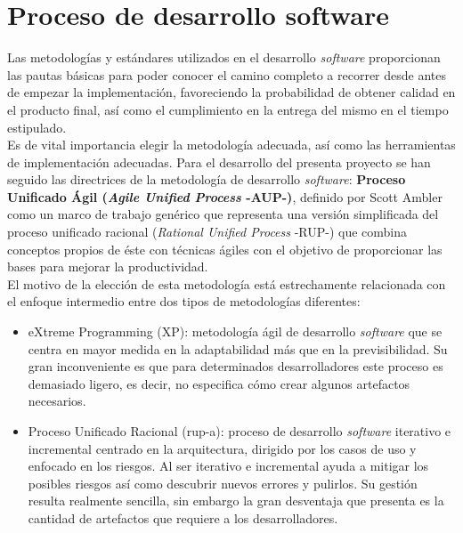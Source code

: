 \documentclass[12pt,a4paper, twoside]{report}
\begin{document}
	\section{Proceso de desarrollo software}

	Las metodologías y estándares utilizados en el desarrollo \textit{software} proporcionan las pautas básicas para poder conocer el camino completo a recorrer desde antes de empezar la implementación, favoreciendo la probabilidad de obtener calidad en el producto final, así como el cumplimiento en la entrega del mismo en el tiempo estipulado. \\
	
	Es de vital importancia elegir la metodología adecuada, así como las herramientas de implementación adecuadas. Para el desarrollo del presenta proyecto se han seguido las directrices de la metodología de desarrollo \textit{software}: \textbf{Proceso Unificado Ágil (\textit{Agile Unified Process} -AUP-)}, definido por Scott Ambler como un marco de trabajo genérico que representa una versión simplificada del proceso unificado racional (\textit{Rational Unified Process} -RUP-) que combina conceptos propios de éste con técnicas ágiles con el objetivo de proporcionar las bases para mejorar la productividad. \\
	
	El motivo de la elección de esta metodología está estrechamente relacionada con el enfoque intermedio entre dos tipos de metodologías diferentes:
	
	\begin{itemize}
		\item eXtreme Programming (XP): metodología ágil de desarrollo \textit{software} que se centra en mayor medida en la adaptabilidad más que en la previsibilidad. Su gran inconveniente es que para determinados desarrolladores este proceso es demasiado ligero, es decir, no especifica cómo crear algunos artefactos necesarios.
		
		\item Proceso Unificado Racional (\gls{rup-a}): proceso de desarrollo \textit{software} iterativo e incremental centrado en la arquitectura, dirigido por los casos de uso y enfocado en los riesgos. Al ser iterativo e incremental ayuda a mitigar los posibles riesgos así como descubrir nuevos errores y pulirlos. Su gestión resulta realmente sencilla, sin embargo la gran desventaja que presenta es la cantidad de artefactos que requiere a los desarrolladores.
	\end{itemize}
	
\end{document}
